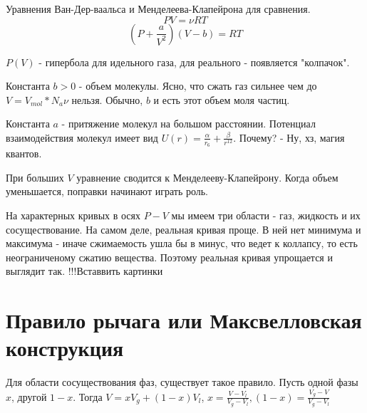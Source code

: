 \documentclass{article}
\begin{document}
Уравнения Ван-Дер-ваальса и Менделеева-Клапейрона для сравнения.
$$PV = \nu RT$$
$$(P + \frac{a}{V^2})(V-b) = RT$$

$P(V)$ - гипербола для идельного  газа, для реального - появляется "колпачок". 

Константа $b>0$ - объем молекулы. Ясно, что сжать газ сильнее чем до $V = V_{mol}*N_a\nu$ нельзя. Обычно, $b$ и есть этот объем моля частиц. 

Константа $a$ - притяжение молекул на большом расстоянии. Потенциал взаимодействия молекул имеет вид $U(r) = \frac{\alpha}{r_6} + \frac{\beta}{r^{12}}$. Почему? - Ну, хз, магия квантов. 

При больших $V$ уравнение сводится к Менделееву-Клапейрону. Когда объем уменьшается, поправки начинают играть роль.

На характерных кривых  в осях $P-V$ мы имеем три области - газ, жидкость и их сосуществование. На самом деле, реальная кривая проще. В ней нет минимума и максимума - иначе сжимаемость ушла бы в минус, что ведет к коллапсу, то есть неограниченому сжатию вещества. Поэтому реальная кривая упрощается и выглядит так.
!!!Вставвить картинки

\section{Правило рычага или Максвелловская конструкция}

Для области сосуществования фаз, существует такое правило. Пусть одной фазы $x$, другой $1-x$. Тогда $V = xV_g + (1-x)V_l$, $x = \frac{V-V_l}{V_g-V_l}, (1-x) = \frac{V_g-V}{V_g-V_l}$
\end{document}
